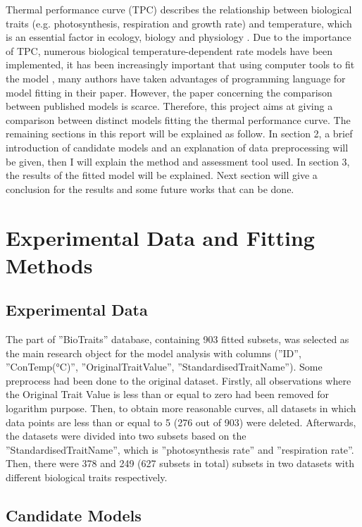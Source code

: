 \documentclass[11pt]{article}
\begin{document}
Thermal performance curve (TPC) describes the relationship between biological traits (e.g. photosynthesis, respiration and growth rate) and temperature, which is an essential factor in ecology, biology and physiology \cite{huey_1989}. Due to the importance of TPC, numerous biological temperature-dependent rate models have been implemented, it has been increasingly important that using computer tools to ﬁt the model \cite{angilletta_2002}, many authors have taken advantages of programming language for model ﬁtting in their paper. However, the paper concerning the comparison between published models is scarce. Therefore, this project aims at giving a comparison between distinct models ﬁtting the thermal performance curve. The remaining sections in this report will be explained as follow. In section 2, a brief introduction of candidate models and an explanation of data preprocessing will be given, then I will explain the method and assessment tool used. In section 3, the results of the ﬁtted model will be explained. Next section will give a conclusion for the results and some future works that can be done.

\section{Experimental Data and Fitting Methods}

\subsection{Experimental Data}

The part of ”BioTraits” database, containing 903 ﬁtted subsets, was selected as the main research object for the model analysis with columns (”ID”, ”ConTemp(°C)”, ”OriginalTraitValue”, ”StandardisedTraitName”). Some preprocess had been done to the original dataset. Firstly, all observations where the Original Trait Value is less than or equal to zero had been removed for logarithm purpose. Then, to obtain more reasonable curves, all datasets in which data points are less than or equal to 5 (276 out of 903) were deleted. Afterwards, the datasets were divided into two subsets based on the ”StandardisedTraitName”, which is ”photosynthesis rate” and ”respiration rate”. Then, there were 378 and 249 (627 subsets in total) subsets in two datasets with different biological traits respectively.

\subsection{Candidate Models}
\end{document}
